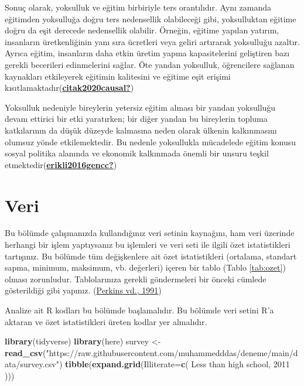 \documentclass[
  12pt,
]{article}
\newenvironment{Shaded}{\begin{snugshade}}{\end{snugshade}}
\newcommand{\AttributeTok}[1]{\textcolor[rgb]{0.13,0.29,0.53}{#1}}
\newcommand{\FunctionTok}[1]{\textcolor[rgb]{0.13,0.29,0.53}{\textbf{#1}}}
\newcommand{\NormalTok}[1]{#1}
\newcommand{\OtherTok}[1]{\textcolor[rgb]{0.56,0.35,0.01}{#1}}
\newcommand{\StringTok}[1]{\textcolor[rgb]{0.31,0.60,0.02}{#1}}
\begin{document}
Sonuç olarak, yoksulluk ve eğitim birbiriyle ters orantılıdır.
Aynı zamanda eğitimden yoksulluğa doğru ters nedensellik olabileceği gibi, yoksulluktan eğitime doğru da eşit derecede nedensellik olabilir. Örneğin, eğitime yapılan yatırım, insanların üretkenliğinin yanı sıra ücretleri veya geliri artırarak yoksulluğu azaltır. Ayrıca eğitim, insanların daha etkin üretim yapma kapasitelerini geliştiren bazı gerekli becerileri edinmelerini sağlar. Öte yandan yoksulluk, öğrencilere sağlanan kaynakları etkileyerek eğitimin kalitesini ve eğitime eşit erişimi kısıtlamaktadır(\protect\hyperlink{ref-citak2020causal}{\textbf{citak2020causal?}})

Yoksulluk nedeniyle bireylerin yetersiz eğitim alması bir yandan yoksulluğu devam ettirici bir etki yaratırken; bir diğer yandan bu bireylerin topluma katkılarının da düşük düzeyde kalmasına neden olarak ülkenin kalkınmasını olumsuz yönde etkilemektedir. Bu nedenle yoksullukla mücadelede eğitim konusu sosyal politika alanında ve ekonomik kalkınmada önemli bir unsuru teşkil etmektedir(\protect\hyperlink{ref-erikli2016gencc}{\textbf{erikli2016gencc?}})

\hypertarget{veri}{%
\section{Veri}\label{veri}}

Bu bölümde çalışmanızda kullandığınız veri setinin kaynağını, ham veri üzerinde herhangi bir işlem yaptıysanız bu işlemleri ve veri seti ile ilgili özet istatistikleri tartışınız. Bu bölümde tüm değişkenlere ait özet istatistikleri (ortalama, standart sapma, minimum, maksimum, vb. değerleri) içeren bir tablo (Tablo \ref{tab:ozet}) olması zorunludur. Tablolarınıza gerekli göndermeleri bir önceki cümlede gösterildiği gibi yapınız. (\protect\hyperlink{ref-perkins:1991}{Perkins vd., 1991})

Analize ait R kodları bu bölümde başlamalıdır. Bu bölümde veri setini R'a aktaran ve özet istatistikleri üreten kodlar yer almalıdır.

\begin{Shaded}
\begin{Highlighting}[]
\FunctionTok{library}\NormalTok{(tidyverse)}
\FunctionTok{library}\NormalTok{(here)}
\NormalTok{survey }\OtherTok{\textless{}{-}} \FunctionTok{read\_csv}\NormalTok{(}\StringTok{"https://raw.githubusercontent.com/muhammedddas/deneme/main/data/survey.csv"}\NormalTok{)}
\FunctionTok{tibble}\NormalTok{(}\FunctionTok{expand.grid}\NormalTok{(}\AttributeTok{Illiterate=}\FunctionTok{c}\NormalTok{( }\StringTok{\textquotesingle{}Less than high school\textquotesingle{}}\NormalTok{, }\StringTok{\textquotesingle{}2011\textquotesingle{}}\NormalTok{ )))}
\end{Highlighting}
\end{Shaded}
\end{document}
